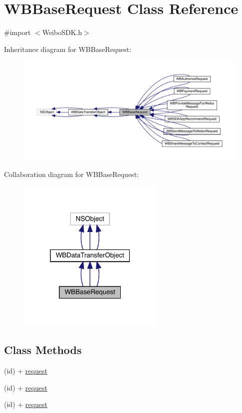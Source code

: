 \hypertarget{interface_w_b_base_request}{}\section{W\+B\+Base\+Request Class Reference}
\label{interface_w_b_base_request}


{\ttfamily \#import $<$Weibo\+S\+D\+K.\+h$>$}



Inheritance diagram for W\+B\+Base\+Request\+:\nopagebreak
\begin{figure}[H]
\begin{center}
\leavevmode
\includegraphics[width=350pt]{interface_w_b_base_request__inherit__graph}
\end{center}
\end{figure}


Collaboration diagram for W\+B\+Base\+Request\+:\nopagebreak
\begin{figure}[H]
\begin{center}
\leavevmode
\includegraphics[width=199pt]{interface_w_b_base_request__coll__graph}
\end{center}
\end{figure}
\subsection*{Class Methods}
\begin{DoxyCompactItemize}
\item 
(id) + \mbox{\hyperlink{interface_w_b_base_request_ab7489935d2d09eab8dbafff096c5432b}{request}}
\item 
(id) + \mbox{\hyperlink{interface_w_b_base_request_ab7489935d2d09eab8dbafff096c5432b}{request}}
\item 
(id) + \mbox{\hyperlink{interface_w_b_base_request_ab7489935d2d09eab8dbafff096c5432b}{request}}
\end{DoxyCompactItemize}
